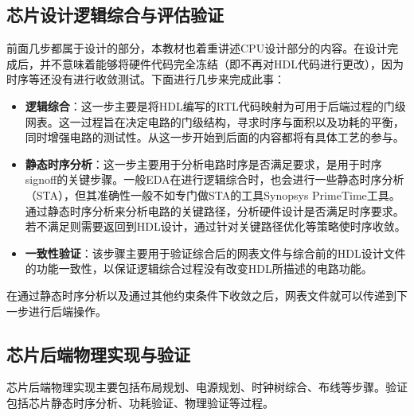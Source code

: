 \subsection{芯片设计逻辑综合与评估验证}\label{sec:01-overview-007}

前面几步都属于设计的部分，本教材也着重讲述CPU设计部分的内容。在设计完成后，并不意味着能够将硬件代码完全冻结（即不再对HDL代码进行更改），因为时序等还没有进行收敛测试。下面进行几步来完成此事：

\begin{itemize}
\tightlist
\item
  \textbf{逻辑综合}：这一步主要是将HDL编写的RTL代码映射为可用于后端过程的门级网表。这一过程旨在决定电路的门级结构，寻求时序与面积以及功耗的平衡，同时增强电路的测试性。从这一步开始到后面的内容都将有具体工艺的参与。
\item
  \textbf{静态时序分析}：这一步主要用于分析电路时序是否满足要求，是用于时序signoff的关键步骤。一般EDA在进行逻辑综合时，也会进行一些静态时序分析（STA），但其准确性一般不如专门做STA的工具Synopsys PrimeTime工具。通过静态时序分析来分析电路的关键路径，分析硬件设计是否满足时序要求。若不满足则需要返回到HDL设计，通过针对关键路径优化等策略使时序收敛。
\item
  \textbf{一致性验证}：该步骤主要用于验证综合后的网表文件与综合前的HDL设计文件的功能一致性，以保证逻辑综合过程没有改变HDL所描述的电路功能。
\end{itemize}

在通过静态时序分析以及通过其他约束条件下收敛之后，网表文件就可以传递到下一步进行后端操作。

\subsection{芯片后端物理实现与验证}\label{sec:01-overview-008}

芯片后端物理实现主要包括布局规划、电源规划、时钟树综合、布线等步骤。验证包括芯片静态时序分析、功耗验证、物理验证等过程。

